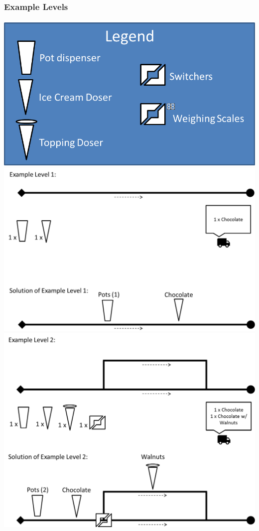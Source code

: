 \documentclass[a4paper]{scrartcl}
\begin{document}
    \subsubsection{Example Levels}
        \includegraphics[width=\textwidth]{levels/legend}
        \includegraphics[width=\textwidth]{levels/01}
        \includegraphics[width=\textwidth]{levels/02}
\end{document}
